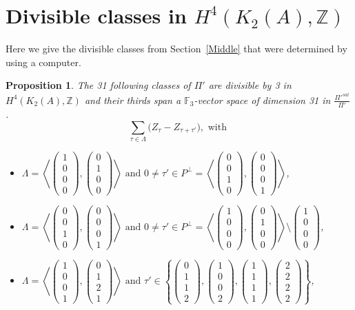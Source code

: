\documentclass{alggeom}
\newcommand{\kum}[2]{K_{ #2 }( #1 )}
\newcommand{\Z}{\mathbb{Z}}
\newcommand{\vect}[1]{\left( \begin{smallmatrix} #1 \end{smallmatrix} \right)}
\newcommand{\plan}[2]{\left< \vect{ #1 }, \vect{ #2 } \right>}
\theoremstyle{plain}
\newtheorem{prop}[theorem]{Proposition}
\theoremstyle{definition}
\theoremstyle{remark}
\begin{document}
\appendix
\section{Divisible classes in $H^4(\kum{A}{2},\Z)$}
Here we give the divisible classes from Section~\ref{Middle} that were determined by using a computer.
\begin{prop}\label{XXXI}
The 31 following classes of $\Pi'$ are divisible by 3 in $H^{4}(K_2(A),\Z)$ and their thirds span a $\mathbb F_3$-vector space of dimension 31 in $\frac{\Pi'^{sat}}{\Pi'}$.
$$\sum_{\tau\in\Lambda} \Big(Z_{\tau} - Z_{\tau+\tau'}\Big), \text{ with }$$
\begin{itemize}
\item[(i)]
$\Lambda=\plan{1\\0\\0\\0}{0\\1\\0\\0} \text{ and } 0\neq \tau'\in P^\perp = \plan{0\\0\\1\\0}{0\\0\\0\\1} $,

\item[(ii)] 
$\Lambda=\plan{0\\0\\1\\0}{0\\0\\0\\1}  \text{ and } 0\neq \tau' \in P^\perp = \plan{1\\0\\0\\0}{0\\1\\0\\0} \setminus \vect{1\\0\\0\\0}$,

\item[(iii)] 
$\Lambda=\plan{1\\0\\0\\1}{0\\1\\2\\1} \text{ and } \tau' \in \left\{ \vect{0\\1\\1\\2},\vect{1\\0\\0\\2},\vect{1\\1\\1\\1},\vect{2\\2\\2\\2} \right\}$,


\end{itemize}
\end{prop}
\end{document}
